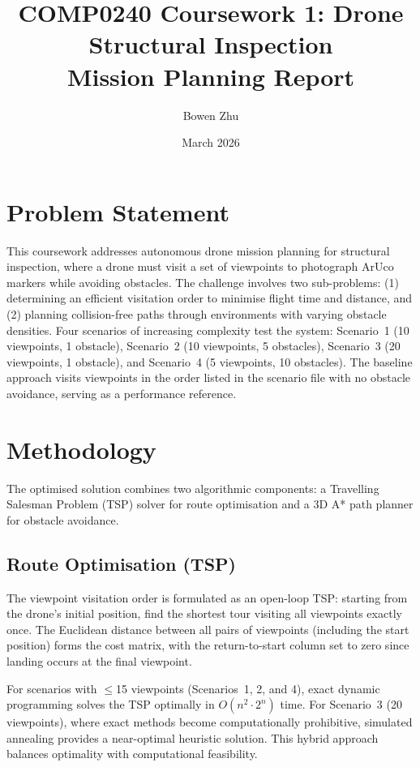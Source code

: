\documentclass[11pt,a4paper]{article}
\title{COMP0240 Coursework 1: Drone Structural Inspection\\Mission Planning Report}
\author{Bowen Zhu}
\date{March 2026}
\begin{document}
\maketitle

\section{Problem Statement}

This coursework addresses autonomous drone mission planning for structural inspection, where a drone must visit a set of viewpoints to photograph ArUco markers while avoiding obstacles. The challenge involves two sub-problems: (1) determining an efficient visitation order to minimise flight time and distance, and (2) planning collision-free paths through environments with varying obstacle densities. Four scenarios of increasing complexity test the system: Scenario~1 (10 viewpoints, 1 obstacle), Scenario~2 (10 viewpoints, 5 obstacles), Scenario~3 (20 viewpoints, 1 obstacle), and Scenario~4 (5 viewpoints, 10 obstacles). The baseline approach visits viewpoints in the order listed in the scenario file with no obstacle avoidance, serving as a performance reference.

\section{Methodology}

The optimised solution combines two algorithmic components: a Travelling Salesman Problem (TSP) solver for route optimisation and a 3D A* path planner for obstacle avoidance.

\subsection{Route Optimisation (TSP)}

The viewpoint visitation order is formulated as an open-loop TSP: starting from the drone's initial position, find the shortest tour visiting all viewpoints exactly once. The Euclidean distance between all pairs of viewpoints (including the start position) forms the cost matrix, with the return-to-start column set to zero since landing occurs at the final viewpoint.

For scenarios with $\leq$15 viewpoints (Scenarios~1, 2, and 4), exact dynamic programming solves the TSP optimally in $O(n^2 \cdot 2^n)$ time. For Scenario~3 (20 viewpoints), where exact methods become computationally prohibitive, simulated annealing provides a near-optimal heuristic solution. This hybrid approach balances optimality with computational feasibility.
\end{document}
